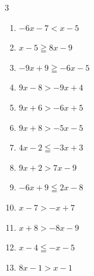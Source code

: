 \begin{multicols}{3}
\begin{enumerate}
        \phantom{$\displaystyle x>-11$}

  \item $-6x-7<x-5$


  \item $x-5\geqq 8x-9$


  \item $-9x+9\geqq -6x-5$


  \item $9x-8>-9x+4$


  \item $9x+6>-6x+5$


  \item $9x+8>-5x-5$


  \item $4x-2\leqq -3x+3$


  \item $9x+2>7x-9$


  \item $-6x+9\leqq 2x-8$


  \item $x-7>-x+7$

        \phantom{$\displaystyle x>7$}

  \item $x+8>-8x-9$


  \item $x-4\leqq -x-5$


  \item $8x-1>x-1$

        \phantom{$\displaystyle x>0$}

\columnbreak %


\end{enumerate}
\end{multicols}

